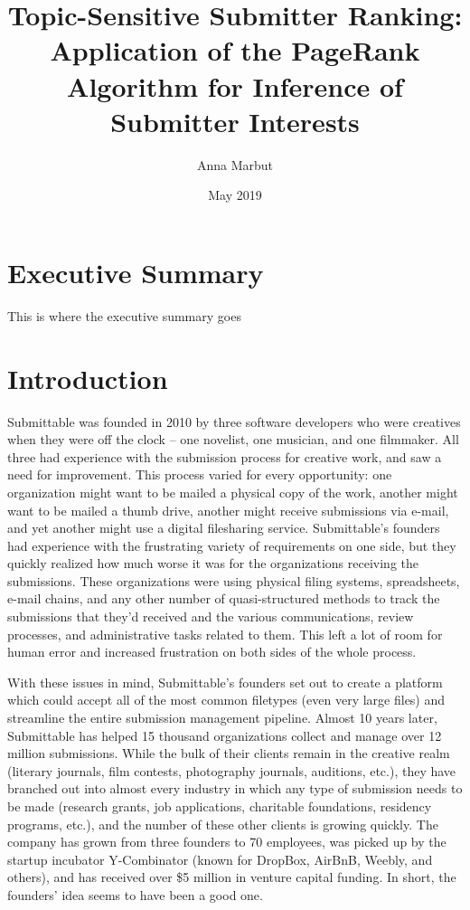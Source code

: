 \documentclass[]{report}   %
\begin{document}
\title{%
Topic-Sensitive Submitter Ranking:\\[0.3em]
\large Application of the PageRank Algorithm for Inference of Submitter Interests}   %
\author{Anna Marbut}         %
\date{May 2019}    %
\maketitle


\chapter*{Executive Summary}
\label{execsum}
  This is where the executive summary goes



\tableofcontents

\chapter{Introduction}

Submittable was founded in 2010 by three software developers who were creatives when they were off the clock -- one novelist, one musician, and one filmmaker. All three had experience with the submission process for creative work, and saw a need for improvement. This process varied for every opportunity: one organization might want to be mailed a physical copy of the work, another might want to be mailed a thumb drive, another might receive submissions via e-mail, and yet another might use a digital filesharing service. Submittable's founders had experience with the frustrating variety of requirements on one side, but they quickly realized how much worse it was for the organizations receiving the submissions. These organizations were using physical filing systems, spreadsheets, e-mail chains, and any other number of quasi-structured methods to track the submissions that they'd received and the various communications, review processes, and administrative tasks related to them. This left a lot of room for human error and increased frustration on both sides of the whole process.

With these issues in mind, Submittable's founders set out to create a platform which could accept all of the most common filetypes (even very large files) and streamline the entire submission management pipeline. Almost 10 years later, Submittable has helped 15 thousand organizations collect and manage over 12 million submissions. While the bulk of their clients remain in the creative realm (literary journals, film contests, photography journals, auditions, etc.), they have branched out into almost every industry in which any type of submission needs to be made (research grants, job applications, charitable foundations, residency programs, etc.), and the number of these other clients is growing quickly. The company has grown from three founders to 70 employees, was picked up by the startup incubator Y-Combinator (known for DropBox, AirBnB, Weebly, and others), and has received over \$5 million in venture capital funding. In short, the founders' idea seems to have been a good one.
\end{document}
